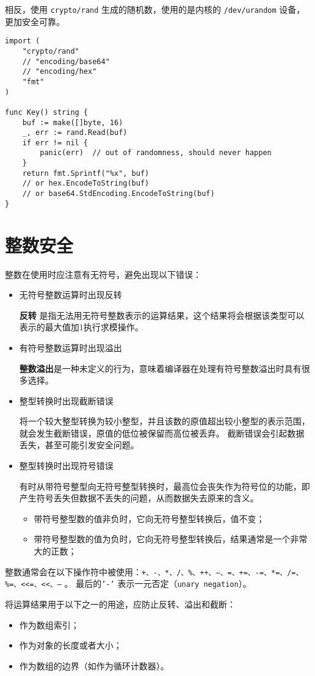 相反，使用 \texttt{crypto/rand} 生成的随机数，使用的是内核的 \texttt{/dev/urandom} 设备，更加安全可靠。

\begin{verbatim}
import (
	"crypto/rand"
	// "encoding/base64"
	// "encoding/hex"
	"fmt"
)

func Key() string {
	buf := make([]byte, 16)
	_, err := rand.Read(buf)
	if err != nil {
		panic(err)  // out of randomness, should never happen
	}
	return fmt.Sprintf("%x", buf)
	// or hex.EncodeToString(buf)
	// or base64.StdEncoding.EncodeToString(buf)
}
\end{verbatim}

\section{整数安全}
整数在使用时应注意有无符号，避免出现以下错误：
\begin{itemize}[leftmargin=4em]
\item 无符号整数运算时出现反转

  \textbf{反转} 是指无法用无符号整数表示的运算结果，这个结果将会根据该类型可以表示的最大值加1执行求模操作。
\item 有符号整数运算时出现溢出

  \textbf{整数溢出}是一种未定义的行为，意味着编译器在处理有符号整数溢出时具有很多选择。
\item 整型转换时出现截断错误

  将一个较大整型转换为较小整型，并且该数的原值超出较小整型的表示范围，就会发生截断错误，原值的低位被保留而高位被丢弃。
  截断错误会引起数据丢失，甚至可能引发安全问题。
\item 整型转换时出现符号错误

  有时从带符号整型向无符号整型转换时，最高位会丧失作为符号位的功能，即产生符号丢失但数据不丢失的问题，从而数据失去原来的含义。
  \begin{itemize}
  \item 带符号整型数的值非负时，它向无符号整型转换后，值不变；
  \item 带符号整型数的值为负时，它向无符号整型转换后，结果通常是一个非常大的正数；
  \end{itemize}
\end{itemize}

整数通常会在以下操作符中被使用：\texttt{+、-、*、/、\%、++、--、=、+=、-=、*=、/=、\%=、<<=、<<、–} 。
最后的\texttt{'-'} 表示一元否定（\texttt{unary negation}）。

将运算结果用于以下之一的用途，应防止反转、溢出和截断：
\begin{itemize}[leftmargin=4em]
\item 作为数组索引；
\item 作为对象的长度或者大小；
\item 作为数组的边界（如作为循环计数器）。
\end{itemize}

